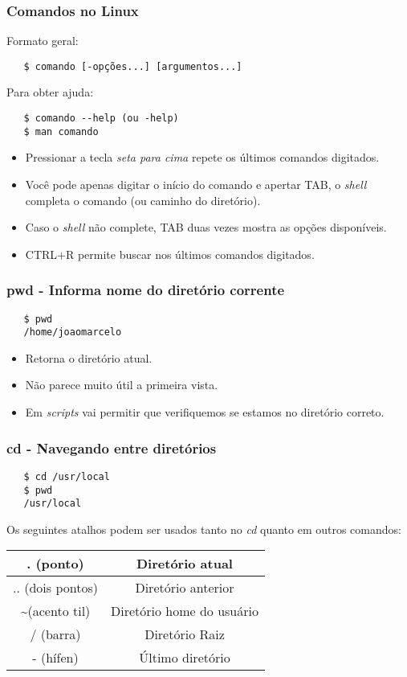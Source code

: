 \documentclass{beamer}
\begin{document}
\begin{frame}[fragile]
   \frametitle{Comandos no Linux}
   Formato geral: 
   \begin{verbatim}
   $ comando [-opções...] [argumentos...] 
   \end{verbatim}
   Para obter ajuda:
   \begin{verbatim}
   $ comando --help (ou -help)
   $ man comando
   \end{verbatim}
   \begin{itemize}
      \item Pressionar a tecla \textit{seta para cima} repete os últimos comandos digitados.
      \item Você pode apenas digitar o início do comando e apertar TAB, o \textit{shell} completa o comando (ou caminho do diretório).
      \item Caso o \textit{shell} não complete, TAB duas vezes mostra as opções disponíveis.
      \item CTRL+R permite buscar nos últimos comandos digitados.
   \end{itemize}
\end{frame}


\begin{frame}[fragile]
   \frametitle{pwd - Informa nome do diretório corrente}
   \begin{verbatim}
   $ pwd 
   /home/joaomarcelo 
   \end{verbatim}
   \begin{itemize}
      \item Retorna o diretório atual.
      \item Não parece muito útil a primeira vista.
      \item Em \textit{scripts} vai permitir que verifiquemos se estamos no diretório correto.
   \end{itemize}
\end{frame}

\begin{frame}[fragile]
   \frametitle{cd - Navegando entre diretórios}
   \begin{verbatim}
   $ cd /usr/local 
   $ pwd
   /usr/local 
   \end{verbatim}
   Os seguintes atalhos podem ser usados tanto no \textit{cd} quanto em outros comandos:
   \begin{table}
      \begin{tabular}{ c | c }
         . (ponto) & Diretório atual \\
         \hline 
         .. (dois pontos) & Diretório anterior \\
         \hline
         \textasciitilde (acento til) & Diretório home do usuário \\
         \hline
         / (barra) & Diretório Raiz \\
         \hline 
         - (hífen) & Último diretório \\
      \end{tabular}
   \end{table}
\end{frame}
\end{document}
